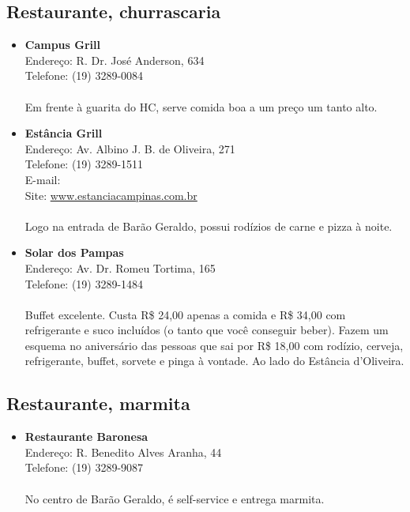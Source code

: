 \subsection{Restaurante, churrascaria}

\begin{itemize}
\item \textbf{Campus Grill}
  \\Endereço: R. Dr. José Anderson, 634
  \\Telefone: (19) 3289-0084
  \\
  \\Em frente à guarita do HC, serve comida boa a um preço um tanto alto.

\item \textbf{Estância Grill}
  \\Endereço: Av. Albino J. B. de Oliveira, 271
  \\Telefone: (19) 3289-1511
  \\E-mail: 
  \\Site: \url{www.estanciacampinas.com.br}
  \\
  \\Logo na entrada de Barão Geraldo, possui rodízios de carne e pizza à noite.

\item \textbf{Solar dos Pampas}
  \\Endereço: Av. Dr. Romeu Tortima, 165
  \\Telefone: (19) 3289-1484
  \\
  \\Buffet excelente. Custa R\$ 24,00 apenas a comida e R\$ 34,00 com
  refrigerante e suco incluídos (o tanto que você conseguir beber). Fazem um
  esquema no aniversário das pessoas que sai por R\$ 18,00 com rodízio,
  cerveja, refrigerante, buffet, sorvete e pinga à vontade. Ao lado do Estância
  d'Oliveira.
\end{itemize}

\subsection{Restaurante, marmita}

\begin{itemize}
\item \textbf{Restaurante Baronesa}
  \\Endereço: R. Benedito Alves Aranha, 44
  \\Telefone: (19) 3289-9087
  \\
  \\No centro de Barão Geraldo, é self-service e entrega marmita.
\end{itemize}

